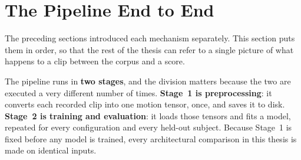 %
%     
%
%
%
%

\section{The Pipeline End to End}
\label{sec:pipeline-overview}

The preceding sections introduced each mechanism separately. This section puts
them in order, so that the rest of the thesis can refer to a single picture of
what happens to a clip between the corpus and a score.

The pipeline runs in \textbf{two stages}, and the division matters because the
two are executed a very different number of times.
\textbf{Stage~1 is preprocessing}: it converts each recorded clip into one
motion tensor, once, and saves it to disk. \textbf{Stage~2 is training and
evaluation}: it loads those tensors and fits a model, repeated for every
configuration and every held-out subject. Because Stage~1 is fixed before any
model is trained, every architectural comparison in this thesis is made on
identical inputs.

